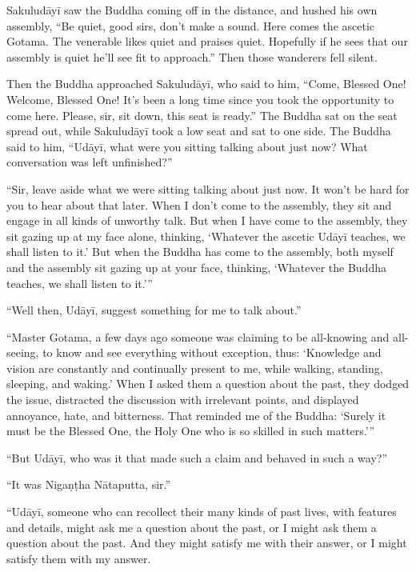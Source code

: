 \documentclass[12pt,openany]{book}%
\begin{document}
\textsanskrit{Sakuludāyī} saw the Buddha coming off in the distance, and hushed his own assembly, “Be quiet, good sirs, don’t make a sound. Here comes the ascetic Gotama. The venerable likes quiet and praises quiet. Hopefully if he sees that our assembly is quiet he’ll see fit to approach.” Then those wanderers fell silent. 

Then the Buddha approached \textsanskrit{Sakuludāyī}, who said to him, “Come, Blessed One! Welcome, Blessed One! It’s been a long time since you took the opportunity to come here. Please, sir, sit down, this seat is ready.” The Buddha sat on the seat spread out, while \textsanskrit{Sakuludāyī} took a low seat and sat to one side. The Buddha said to him, “\textsanskrit{Udāyī}, what were you sitting talking about just now? What conversation was left unfinished?” 

“Sir, leave aside what we were sitting talking about just now. It won’t be hard for you to hear about that later. When I don’t come to the assembly, they sit and engage in all kinds of unworthy talk. But when I have come to the assembly, they sit gazing up at my face alone, thinking, ‘Whatever the ascetic \textsanskrit{Udāyī} teaches, we shall listen to it.’ But when the Buddha has come to the assembly, both myself and the assembly sit gazing up at your face, thinking, ‘Whatever the Buddha teaches, we shall listen to it.’” 

“Well then, \textsanskrit{Udāyī}, suggest something for me to talk about.” 

“Master Gotama, a few days ago someone was claiming to be all-knowing and all-seeing, to know and see everything without exception, thus: ‘Knowledge and vision are constantly and continually present to me, while walking, standing, sleeping, and waking.’ When I asked them a question about the past, they dodged the issue, distracted the discussion with irrelevant points, and displayed annoyance, hate, and bitterness. That reminded me of the Buddha: ‘Surely it must be the Blessed One, the Holy One who is so skilled in such matters.’” 

“But \textsanskrit{Udāyī}, who was it that made such a claim and behaved in such a way?” 

“It was \textsanskrit{Nigaṇṭha} \textsanskrit{Nātaputta}, sir.” 

“\textsanskrit{Udāyī}, someone who can recollect their many kinds of past lives, with features and details, might ask me a question about the past, or I might ask them a question about the past. And they might satisfy me with their answer, or I might satisfy them with my answer. 
\end{document}
